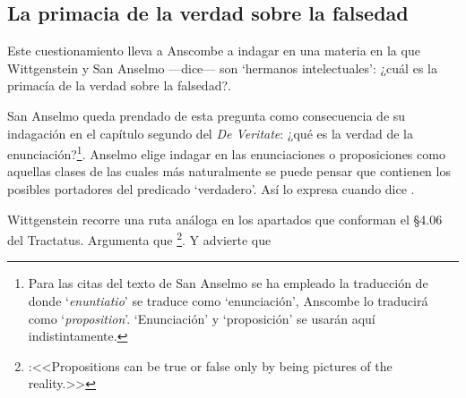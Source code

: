 \subsection{La primacia de la verdad sobre la falsedad}
Este cuestionamiento lleva a Anscombe a indagar en una materia en la que
Wittgenstein y San Anselmo ---dice--- son `hermanos intelectuales': ¿cuál es la
primacía de la verdad sobre la
falsedad?\autocite[Cf.~][73]{anscombe2011plato:truth}.

San Anselmo queda prendado de esta pregunta como consecuencia de su indagación
en el capítulo segundo del \emph{De Veritate}: ¿qué es la verdad de la
enunciación?\footnote{\cite[Cf.~][493]{anselm1952obras:deveritate} Para las
  citas del texto de San Anselmo se ha empleado la traducción de
  \cite{anselm1952obras} donde `\emph{enuntiatio}' se traduce como
  `enunciación', Anscombe lo traducirá como `\emph{proposition}'. `Enunciación'
  y `proposición' se usarán aquí indistintamente.}. Anselmo elige indagar en las
enunciaciones o proposiciones como aquellas clases de las cuales más
naturalmente se puede pensar que contienen los posibles portadores del predicado
`verdadero'. Así lo expresa cuando dice \autocite[493]{anselm1952obras:deveritate}.

Wittgenstein recorre una ruta análoga en los apartados que conforman el \S4.06
del Tractatus. Argumenta que \footnote{\cite[\S4.06]{wittgenstein1922tractatus}:<<Propositions can
  be true or false only by being pictures of the reality.>>}. Y advierte que

